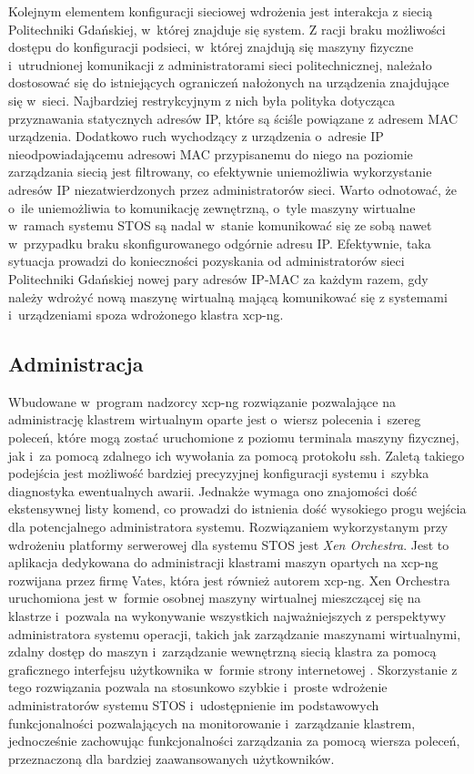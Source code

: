 \noindent Kolejnym elementem konfiguracji sieciowej wdrożenia jest interakcja z siecią Politechniki Gdańskiej, w~której znajduje się system. Z racji braku możliwości dostępu do konfiguracji podsieci, w~której znajdują się maszyny fizyczne i~utrudnionej komunikacji z administratorami sieci politechnicznej, należało dostosować się do istniejących ograniczeń nałożonych na urządzenia znajdujące się w~sieci. Najbardziej restrykcyjnym z nich była polityka dotycząca przyznawania statycznych adresów IP, które są ściśle powiązane z adresem MAC urządzenia. Dodatkowo ruch wychodzący z urządzenia o~adresie IP nieodpowiadającemu adresowi MAC przypisanemu do niego na poziomie zarządzania siecią jest filtrowany, co efektywnie uniemożliwia wykorzystanie adresów IP niezatwierdzonych przez administratorów sieci. Warto odnotować, że o~ile uniemożliwia to komunikację zewnętrzną, o~tyle maszyny wirtualne w~ramach systemu STOS są nadal w~stanie komunikować się ze sobą nawet w~przypadku braku skonfigurowanego odgórnie adresu IP. Efektywnie, taka sytuacja prowadzi do konieczności pozyskania od administratorów sieci Politechniki Gdańskiej nowej pary adresów IP-MAC za każdym razem, gdy należy wdrożyć nową maszynę wirtualną mającą komunikować się z systemami i~urządzeniami spoza wdrożonego klastra xcp-ng.
\subsection{Administracja}
Wbudowane w~program nadzorcy xcp-ng rozwiązanie pozwalające na administrację klastrem wirtualnym oparte jest o~wiersz polecenia i~szereg poleceń, które mogą zostać uruchomione z poziomu terminala maszyny fizycznej, jak i~za pomocą zdalnego ich wywołania za pomocą protokołu ssh. Zaletą takiego podejścia jest możliwość bardziej precyzyjnej konfiguracji systemu i~szybka diagnostyka ewentualnych awarii. Jednakże wymaga ono znajomości dość ekstensywnej listy komend, co prowadzi do istnienia dość wysokiego progu wejścia dla potencjalnego administratora systemu. 
\noindent Rozwiązaniem wykorzystanym przy wdrożeniu platformy serwerowej dla systemu STOS jest \textit{Xen Orchestra}. Jest to aplikacja dedykowana do administracji klastrami maszyn opartych na xcp-ng rozwijana przez firmę Vates, która jest również autorem xcp-ng. Xen Orchestra uruchomiona jest w~formie osobnej maszyny wirtualnej mieszczącej się na klastrze i~pozwala na wykonywanie wszystkich najważniejszych z perspektywy administratora systemu operacji, takich jak zarządzanie maszynami wirtualnymi, zdalny dostęp do maszyn i~zarządzanie wewnętrzną siecią klastra za pomocą graficznego interfejsu użytkownika w~formie strony internetowej \cite{xoa}. Skorzystanie z tego rozwiązania pozwala na stosunkowo szybkie i~proste wdrożenie administratorów systemu STOS i~udostępnienie im podstawowych funkcjonalności pozwalających na monitorowanie i~zarządzanie klastrem, jednocześnie zachowując funkcjonalności zarządzania za pomocą wiersza poleceń, przeznaczoną dla bardziej zaawansowanych użytkowników.
